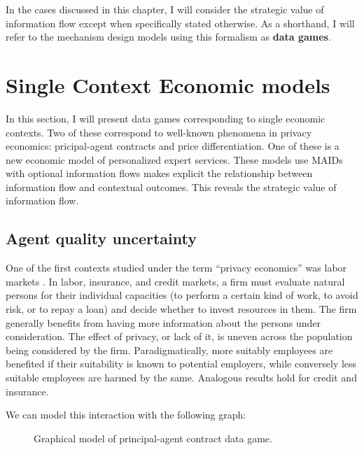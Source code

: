 \documentclass[../thesis.tex]{subfiles}
\begin{document}
In the cases discussed in this chapter, I will consider
the strategic value of information flow except when specifically
stated otherwise.
As a shorthand, I will refer to the mechanism design models
using this formalism as \textbf{data games}.

\section{Single Context Economic models}
\label{sec:single-context}

In this section, I will present data games corresponding
to single economic contexts.
Two of these correspond to well-known
phenomena in privacy economics: pricipal-agent contracts
and price differentiation.
One of these is a new economic model of
personalized expert services.
These models
use MAIDs with optional information flows
makes explicit the relationship
between information flow and contextual outcomes.
This reveals the strategic value of information flow.

\subsection{Agent quality uncertainty}
\label{sec:agent-quality}

One of the first contexts studied under the
term ``privacy economics'' was labor
markets \cite{posner1981economics}.
In labor, insurance, and credit markets,
a firm must evaluate natural persons
for their individual capacities (to perform a certain kind
of work, to avoid risk, or to repay a loan) and decide
whether to invest resources in them.
The firm generally benefits from having more information
about the persons under consideration.
The effect of privacy, or lack of it, is uneven across
the population being considered by the firm.
Paradigmatically, more suitably employees are benefited
if their suitability is known to potential employers,
while conversely less suitable employees are harmed
by the same.
Analogous results hold for credit and insurance.

We can model this interaction with the following graph:

\begin{figure}
\begin{center}
\end{center}
\caption{Graphical model of principal-agent contract data game.}
\end{figure}
\end{document}
